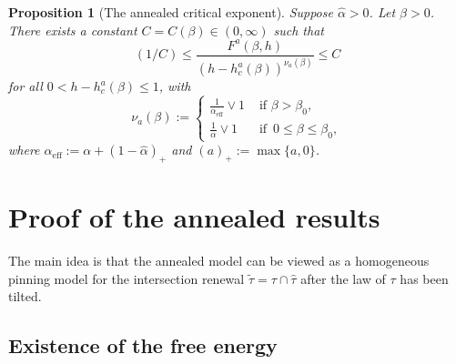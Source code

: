 \documentclass[11pt]{article}
\newtheorem{prop}[theo]{Proposition}
\theoremstyle{definition}
\numberwithin{equation}{section}
\numberwithin{figure}{section}
\numberwithin{table}{section}
\newcommand{\ga}{\alpha}
\newcommand{\gb}{\beta}
\renewcommand{\tilde}{\widetilde}
\newcommand{\ef}{\mathrm{eff}}
\newcommand{\htau}{\hat\tau}
\newcommand{\ha}{\hat\ga}
\begin{document}
\begin{prop}[The annealed critical exponent] \label{ACExp}
Suppose $\ha > 0$. Let $\gb > 0$. There exists a constant $C = C(\gb) \in (0,\infty)$ such that
\begin{equation}\label{ACExpRelation}
(1/C) \leq \frac{F^a(\gb,h)}{(h - h_c^a(\gb))^{\nu_a(\gb)}} \leq C
\end{equation}
for all $0 < h - h_c^a(\gb) \leq 1$, with
\begin{equation}
\nu_a(\gb) :=
\begin{cases}
\frac{1}{\ga_{\ef}} \vee 1 & \text{ if } \gb > \gb_0,\\[4pt]
\frac{1}{\ga} \vee 1 & \text{ if } \, 0 \leq \gb \leq \gb_0,
\end{cases}
\end{equation}
where $\ga_\ef := \ga + (1 - \ha)_+$ and $(a)_+ := \max\{a,0\}$.
\end{prop}

\section{Proof of the annealed results}\label{sec3}

The main idea is that the annealed model can be viewed as a homogeneous pinning model for the intersection renewal $\tilde\tau = \tau \cap \htau$ after the law of $\tau$ has been tilted.

\subsection{Existence of the free energy}\label{sec3.1}
\end{document}
